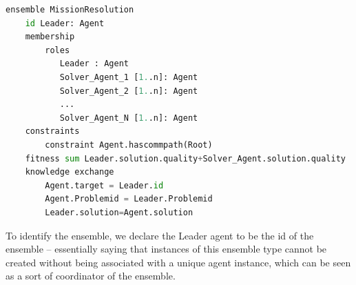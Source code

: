 \documentclass[journal]{IEEEtran}
\theoremstyle{definition}
\begin{document}
\begin{lstlisting}[caption=EDL Specification for mission resolution ensembles, language=Python]
ensemble MissionResolution
    id Leader: Agent
    membership
        roles
           Leader : Agent
           Solver_Agent_1 [1..n]: Agent
           Solver_Agent_2 [1..n]: Agent
           ...
           Solver_Agent_N [1..n]: Agent
    constraints
        constraint Agent.hascommpath(Root)
    fitness sum Leader.solution.quality+Solver_Agent.solution.quality
    knowledge exchange
        Agent.target = Leader.id
        Agent.Problemid = Leader.Problemid
        Leader.solution=Agent.solution
\end{lstlisting}



To identify the ensemble, we declare the Leader agent to be the id of the ensemble – essentially
saying that instances of this ensemble type cannot be
created without being associated with a unique agent
instance, which can be seen as a sort of coordinator
of the ensemble.
\end{document}
